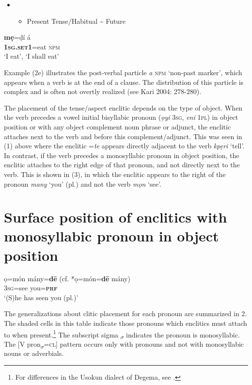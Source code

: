 \documentclass[output=paper]{langsci/langscibook}
\begin{document}
\begin{itemize}
\item \setcounter{itemize}{0}
\begin{itemize}
\item \begin{stylelsEnumerated}
Present Tense/Habitual {\textasciitilde} Future
\end{stylelsEnumerated}
\end{itemize}
\end{itemize}
\gll \textbf{mẹ}=ḍí     á\\
     \textbf{\textsc{1sg.set1}}=eat  \textsc{npm}\\
\glt ‘I eat’, ‘I shall eat’ \citep[45]{Kari1997}
\z

Example (2e) illustrates the post-verbal particle \textit{a} \textsc{npm} ‘non-past marker’, which appears when a verb is at the end of a clause. The distribution of this particle is complex and is often not overtly realized (see Kari 2004: 278-280).

The placement of the tense/aspect enclitic depends on the type of object. When the verb precedes a vowel initial bisyllabic pronoun (\textit{ọyi} \textsc{3sg}, \textit{eni} \textsc{1pl}) in object position or with any object complement noun phrase or adjunct, the enclitic attaches next to the verb and before this complement/adjunct. This was seen in (1) above where the enclitic =\textit{te} appears directly adjacent to the verb \textit{kpẹri} ‘tell’. In contrast, if the verb precedes a monosyllabic pronoun in object position, the enclitic attaches to the right edge of that pronoun, and not directly next to the verb. This is shown in (3), in which the enclitic appears to the right of the pronoun \textit{many }‘you’ (pl.) and not the verb \textit{mọn} ‘see’.

\chapter[Surface position of enclitics with monosyllabic pronoun in object position]{Surface position of enclitics with monosyllabic pronoun in object position}
\label{bkm:Ref406317030}\gll ọ=món   mány=\textbf{d\={e}  }(cf. *ọ=món=\textbf{d\={e}} mány)\\
     3\textsc{sg}=see   you=\textbf{\textsc{prf}}\\
\glt ‘(S)he has seen you (pl.)’ \citep[341]{Kari2004} 
\z

The generalizations about clitic placement for each pronoun are summarized in 2. The shaded cells in this table indicate those pronouns which enclitics must attach to when present.\footnote{For differences in the Usokun dialect of Degema, see \citet{Offah2000}. 
} The subscript sigma \textsubscript{$\sigma $} indicates the pronoun is monosyllabic. The [V pron\textsubscript{$\sigma $}=\textsc{cl}] pattern occurs only with pronouns and not with monosyllabic nouns or adverbials.
\end{document}
